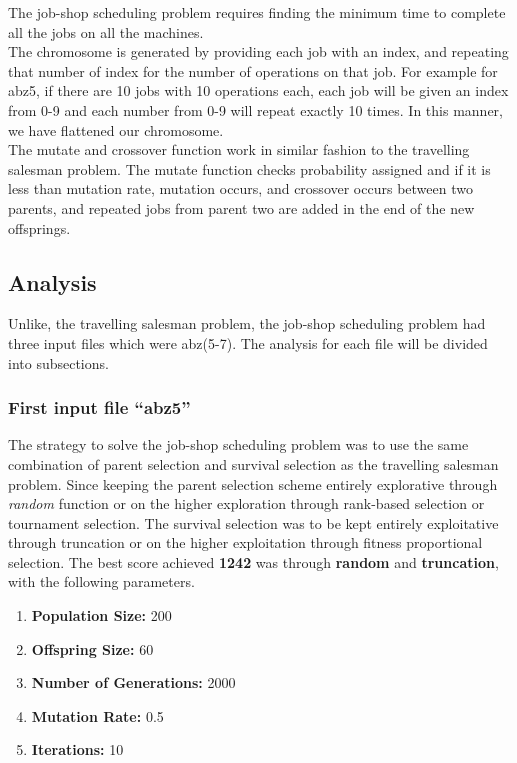 \documentclass[12pt]{article}
\begin{document}
The job-shop scheduling problem requires finding the minimum time to complete all the jobs on all the machines.
\\ \newline
The chromosome is generated by providing each job with an index, and repeating that number of index for the number of operations on that job. For example for abz5, if there are 10 jobs with 10 operations each, each job will be given an index from 0-9 and each number from 0-9 will repeat exactly 10 times. In this manner, we have flattened our chromosome. 
\\ \newline
The mutate and crossover function work in similar fashion to the travelling salesman problem. The mutate function checks probability assigned and if it is less than mutation rate, mutation occurs, and crossover occurs between two parents, and repeated jobs from parent two are added in the end of the new offsprings. 

\subsection{Analysis}

Unlike, the travelling salesman problem, the job-shop scheduling problem had three input files which were abz(5-7). The analysis for each file will be divided into subsections.

\subsubsection{First input file ``abz5''}

The strategy to solve the job-shop scheduling problem was to use the same combination of parent selection and survival selection as the travelling salesman problem. Since keeping the parent selection scheme entirely explorative through \textit{random} function or on the higher exploration through rank-based selection or tournament selection. The survival selection was to be kept entirely exploitative through truncation or on the higher exploitation through fitness proportional selection. The best score achieved \textbf{1242} was through \textbf{random} and \textbf{truncation}, with the following parameters. 

\begin{enumerate}
    \item \textbf{Population Size:} 200
    \item \textbf{Offspring Size:} 60
    \item \textbf{Number of Generations:} 2000
    \item \textbf{Mutation Rate:} 0.5
    \item \textbf{Iterations:} 10
\end{enumerate}
\end{document}
